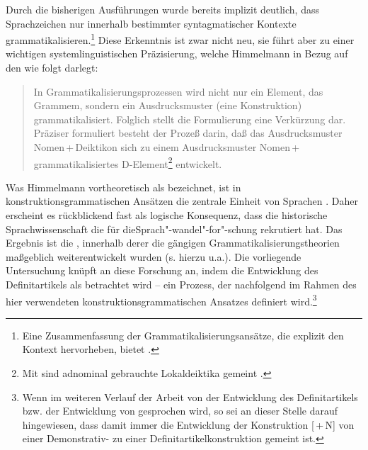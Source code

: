 Durch die bisherigen Ausführungen wurde bereits implizit deutlich, dass Sprachzeichen nur innerhalb bestimmter syntagmatischer Kontexte grammatikalisieren.\footnote{Eine Zusammenfassung der Grammatikalisierungsansätze, die explizit den Kontext hervorheben, bietet \textcite{Traugott2003,Traugott2008a}.} 
Diese Erkenntnis ist zwar nicht neu, sie führt aber zu einer wichtigen systemlinguistischen Präzisierung, welche Himmelmann in Bezug auf den  wie folgt darlegt: \blockcquote[31]{Himmelmann1997}{In Grammatikalisierungsprozessen  wird nicht nur ein Element, das Grammem, sondern ein Ausdrucksmuster (eine Konstruktion) grammatikalisiert. Folglich stellt die Formulierung   eine Verkürzung dar. Präziser formuliert besteht der Prozeß darin, daß das Ausdrucksmuster Nomen\,+\,Deiktikon sich zu einem Ausdrucksmuster Nomen\,+\,grammatikalisiertes D-Element\footnote{Mit  sind adnominal gebrauchte Lokaldeiktika gemeint \parencite[6]{Himmelmann1997}.} 
 entwickelt.} 
Was Himmelmann vortheoretisch als   bezeichnet, ist in kon\-struk\-tions\-grammatischen Ansätzen die zentrale Einheit von Sprachen \parencite[s. u.a.][]{Goldberg1995,Goldberg2006}. Daher erscheint es rückblickend fast als logische Konsequenz, dass die historische Sprachwissenschaft die  für die\linebreak Sprach"-wandel"-for"-schung rekrutiert hat. Das Ergebnis ist die  \parencite[vgl. u.a.][]{Barddal2015}, innerhalb derer die gängigen Grammatikalisierungstheorien maßgeblich weiterentwickelt wurden (s. hierzu u.a.\citealt{Traugott2003,Bergs2008,Diewald2008,Fried2013,Traugott2013}). Die vorliegende Untersuchung knüpft an diese Forschung an, indem die Entwicklung des Definitartikels als  betrachtet wird -- ein Prozess, der nachfolgend im Rahmen des hier verwendeten konstruktionsgrammatischen Ansatzes definiert wird.\footnote{Wenn im weiteren Verlauf der Arbeit von der Entwicklung des Definitartikels bzw. der Entwicklung von  gesprochen wird, so sei an dieser Stelle darauf hingewiesen, dass damit immer die Entwicklung der Konstruktion  [\,+\,N] von einer Demonstrativ-   zu einer Definitartikelkonstruktion gemeint ist.}  


